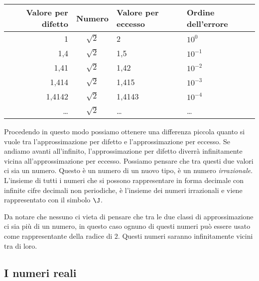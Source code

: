 \begin{center}
\begin{tabular}{rcll}
\toprule
Valore per difetto & Numero &Valore per eccesso & Ordine dell'errore\\
\midrule
1 & \(\sqrt{2}\)  & 2  & \(10^{0}\)\\
1,4 & \(\sqrt{2}\) & 1,5  & \(10^{-1}\)\\
1,41 & \(\sqrt{2}\) & 1,42 & \(10^{-2}\)\\
1,414 & \(\sqrt{2}\) &1,415 & \(10^{-3}\)\\
1,4142 & \(\sqrt{2}\) & 1,4143 & \(10^{-4}\)\\
\ldots & \(\sqrt{2}\) & \ldots & \ldots\\
\bottomrule
\end{tabular}
\end{center}

Procedendo in questo modo possiamo ottenere una differenza piccola quanto 
si vuole tra l'approssimazione per difetto e l'approssimazione per eccesso.
Se andiamo avanti all'infinito, l'approssimazione per difetto diverrà 
infinitamente vicina all'approssimazione per eccesso. 
Possiamo pensare che tra questi due valori ci sia un numero. 
Questo è un numero di un nuovo tipo, è un numero \emph{irrazionale}. 
L'insieme di tutti i numeri che si possono rappresentare in forma 
decimale con infinite cifre decimali non periodiche, è l'insieme
dei numeri irrazionali e viene rappresentato con il simbolo \(\J\).

\begin{osservazione}{}{}
Da notare che nessuno ci vieta di pensare che tra le due classi di 
approssimazione ci sia più di un numero, in questo caso ognuno di questi 
numeri può essere usato come rappresentante della radice di \(2\).
Questi numeri saranno infinitamente vicini tra di loro.
\end{osservazione}



\subsection{I numeri reali}


